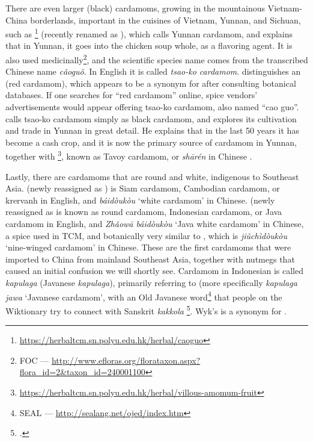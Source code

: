 There are even larger (black) cardamoms, growing in the mountainous Vietnam-China borderlands, important in the cuisines of Vietnam, Yunnan, and Sichuan, such as \footnote{\url{https://herbaltcm.sn.polyu.edu.hk/herbal/caoguo}} (recently renamed as ), which \textcite[326]{hu_food_2005} calls Yunnan cardamom, and explains that in Yunnan, it goes into the chicken soup whole, as a flavoring agent. It is also used medicinally\footnote{\gls{FOC} --- \url{http://www.efloras.org/florataxon.aspx?flora_id=2&taxon_id=240001100}}, and the scientific species name comes from the transcribed Chinese name  \textit{cǎoguǒ}. In English it is called \textit{tsao-ko cardamom}. \textcite[326]{hu_food_2005} distinguishes an  (red cardamom), which appears to be a synonym for  after consulting botanical databases. If one searches for ``red cardamom'' online, spice vendors' advertisements would appear offering tsao-ko cardamom, also named ``cao guo''. \textcite{putzel_spice_2017} calls tsao-ko cardamom simply as black cardamom, and explores its cultivation and trade in Yunnan in great detail. He explains that in the last 50 years it has become a cash crop, and it is now the primary source of cardamom in Yunnan, together with \footnote{\url{https://herbaltcm.sn.polyu.edu.hk/herbal/villous-amomum-fruit}}, known as Tavoy cardamom, or  \textit{shārén} in Chinese \autocite[41]{putzel_spice_2017}.

Lastly, there are cardamoms that are round and white, indigenous to Southeast Asia.  (newly reassigned as ) is Siam cardamom, Cambodian cardamom, or krervanh in English, and  \textit{báidòukòu} `white cardamom' in Chinese.  (newly reassigned as  is known as round cardamom, Indonesian cardamom, or Java cardamom in English, and  \textit{Zhǎowā báidòukòu} `Java white cardamom' in Chinese, a spice used in \gls{TCM}, and botanically very similar to , which is  \textit{jiǔchìdòukòu} `nine-winged cardamom' in Chinese. These are the first cardamoms that were imported to China from mainland Southeast Asia, together with nutmegs that caused an initial confusion we will shortly see. Cardamom in Indonesian is called \textit{kapulaga} (Javanese  
\textit{kapulaga}), primarily referring to  (more specifically \textit{kapulaga jawa} `Javanese cardamom', with an Old Javanese word\footnote{\gls{SEAL} --- \url{http://sealang.net/ojed/index.htm}} that people on the Wiktionary try to connect with Sanskrit  \textit{kakkola} \footcite[241. ]{monier-williams_sanskrit-english_1899}. Wyk's  is a synonym for .

